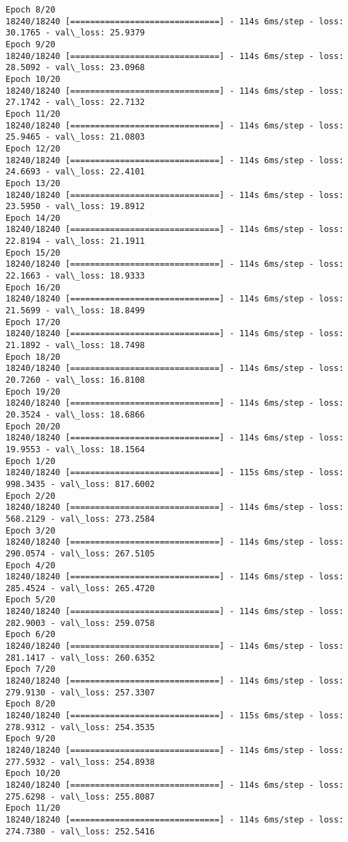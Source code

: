 \documentclass[11pt]{article}
\begin{document}
\begin{Verbatim}[commandchars=\\\{\}]
Epoch 8/20
18240/18240 [==============================] - 114s 6ms/step - loss: 30.1765 - val\_loss: 25.9379
Epoch 9/20
18240/18240 [==============================] - 114s 6ms/step - loss: 28.5092 - val\_loss: 23.0968
Epoch 10/20
18240/18240 [==============================] - 114s 6ms/step - loss: 27.1742 - val\_loss: 22.7132
Epoch 11/20
18240/18240 [==============================] - 114s 6ms/step - loss: 25.9465 - val\_loss: 21.0803
Epoch 12/20
18240/18240 [==============================] - 114s 6ms/step - loss: 24.6693 - val\_loss: 22.4101
Epoch 13/20
18240/18240 [==============================] - 114s 6ms/step - loss: 23.5950 - val\_loss: 19.8912
Epoch 14/20
18240/18240 [==============================] - 114s 6ms/step - loss: 22.8194 - val\_loss: 21.1911
Epoch 15/20
18240/18240 [==============================] - 114s 6ms/step - loss: 22.1663 - val\_loss: 18.9333
Epoch 16/20
18240/18240 [==============================] - 114s 6ms/step - loss: 21.5699 - val\_loss: 18.8499
Epoch 17/20
18240/18240 [==============================] - 114s 6ms/step - loss: 21.1892 - val\_loss: 18.7498
Epoch 18/20
18240/18240 [==============================] - 114s 6ms/step - loss: 20.7260 - val\_loss: 16.8108
Epoch 19/20
18240/18240 [==============================] - 114s 6ms/step - loss: 20.3524 - val\_loss: 18.6866
Epoch 20/20
18240/18240 [==============================] - 114s 6ms/step - loss: 19.9553 - val\_loss: 18.1564
Epoch 1/20
18240/18240 [==============================] - 115s 6ms/step - loss: 998.3435 - val\_loss: 817.6002
Epoch 2/20
18240/18240 [==============================] - 114s 6ms/step - loss: 568.2129 - val\_loss: 273.2584
Epoch 3/20
18240/18240 [==============================] - 114s 6ms/step - loss: 290.0574 - val\_loss: 267.5105
Epoch 4/20
18240/18240 [==============================] - 114s 6ms/step - loss: 285.4524 - val\_loss: 265.4720
Epoch 5/20
18240/18240 [==============================] - 114s 6ms/step - loss: 282.9003 - val\_loss: 259.0758
Epoch 6/20
18240/18240 [==============================] - 114s 6ms/step - loss: 281.1417 - val\_loss: 260.6352
Epoch 7/20
18240/18240 [==============================] - 114s 6ms/step - loss: 279.9130 - val\_loss: 257.3307
Epoch 8/20
18240/18240 [==============================] - 115s 6ms/step - loss: 278.9312 - val\_loss: 254.3535
Epoch 9/20
18240/18240 [==============================] - 114s 6ms/step - loss: 277.5932 - val\_loss: 254.8938
Epoch 10/20
18240/18240 [==============================] - 114s 6ms/step - loss: 275.6298 - val\_loss: 255.8087
Epoch 11/20
18240/18240 [==============================] - 114s 6ms/step - loss: 274.7380 - val\_loss: 252.5416

\end{Verbatim}
\end{document}
